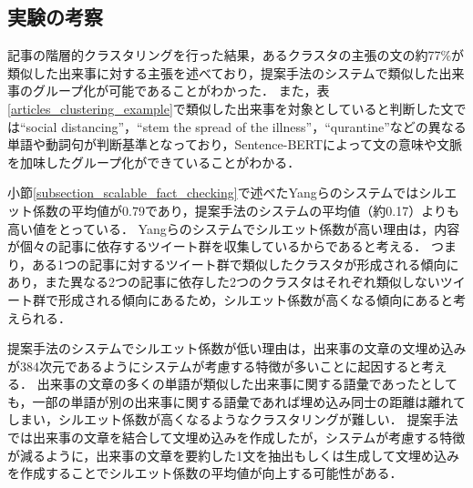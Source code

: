 \documentclass[12pt,a4j,dvipdfmx]{jreport}
\begin{document}

\subsection{実験の考察}
記事の階層的クラスタリングを行った結果，あるクラスタの主張の文の約77\%が類似した出来事に対する主張を述べており，提案手法のシステムで類似した出来事のグループ化が可能であることがわかった．
また，表\ref{articles_clustering_example}で類似した出来事を対象としていると判断した文では``social distancing''，``stem the spread of the illness''，``qurantine''などの異なる単語や動詞句が判断基準となっており，Sentence-BERTによって文の意味や文脈を加味したグループ化ができていることがわかる．

小節\ref{subsection_scalable_fact_checking}で述べたYangらのシステムではシルエット係数の平均値が0.79であり，提案手法のシステムの平均値（約0.17）よりも高い値をとっている\cite{yang_scalable_2021}．
Yangらのシステムでシルエット係数が高い理由は，内容が個々の記事に依存するツイート群を収集しているからであると考える．
つまり，ある1つの記事に対するツイート群で類似したクラスタが形成される傾向にあり，また異なる2つの記事に依存した2つのクラスタはそれぞれ類似しないツイート群で形成される傾向にあるため，シルエット係数が高くなる傾向にあると考えられる．

提案手法のシステムでシルエット係数が低い理由は，出来事の文章の文埋め込みが384次元であるようにシステムが考慮する特徴が多いことに起因すると考える．
出来事の文章の多くの単語が類似した出来事に関する語彙であったとしても，一部の単語が別の出来事に関する語彙であれば埋め込み同士の距離は離れてしまい，シルエット係数が高くなるようなクラスタリングが難しい．
提案手法では出来事の文章を結合して文埋め込みを作成したが，システムが考慮する特徴が減るように，出来事の文章を要約した1文を抽出もしくは生成して文埋め込みを作成することでシルエット係数の平均値が向上する可能性がある．
\end{document}
